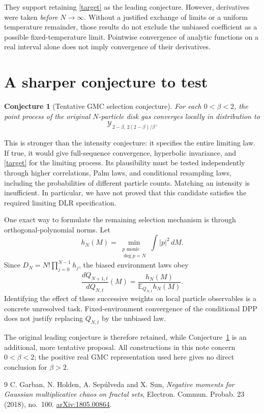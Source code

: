 \documentclass[11pt]{article}
\newcommand{\E}{\mathbb E}
\newtheorem{conjecture}{Conjecture}
\begin{document}
They support retaining \eqref{target} as the leading conjecture. However,
derivatives were taken \emph{before} $N\to\infty$. Without a justified
exchange of limits or a uniform temperature remainder, those results do
not exclude the unbiased coefficient as a possible fixed-temperature
limit. Pointwise convergence of analytic functions on a real interval
alone does not imply convergence of their derivatives.

\section{A sharper conjecture to test}
\begin{conjecture}[Tentative GMC selection conjecture]\label{selection}
For each $0<\beta<2$, the point process of the original $N$-particle disk
gas converges locally in distribution to
\[
 \mathcal Y_{\,2-\beta,\,2(2-\beta)/\beta}.
\]
\end{conjecture}
This is stronger than the intensity conjecture: it specifies the entire
limiting law. If true, it would give full-sequence convergence, hyperbolic
invariance, and \eqref{target} for the limiting process. Its plausibility
must be tested independently through higher correlations, Palm laws, and
conditional resampling laws, including the probabilities of different
particle counts. Matching an intensity is insufficient. In particular,
we have not proved that this candidate satisfies the required limiting
DLR specification.

One exact way to formulate the remaining selection mechanism is through
orthogonal-polynomial norms. Let
\[
 h_N(M)=\min_{\substack{p\text{ monic}\\\deg p=N}}\int|p|^2\,dM.
\]
Since $D_N=N!\prod_{j=0}^{N-1}h_j$, the biased environment laws obey
\begin{equation}\label{increment}
 \frac{dQ_{N+1,t}}{dQ_{N,t}}(M)
 =\frac{h_N(M)}{\E_{Q_{N,t}}h_N(M)}.
\end{equation}
Identifying the effect of these successive weights on local particle
observables is a concrete unresolved task. Fixed-environment convergence
of the conditional DPP does not justify replacing $Q_{N,t}$ by the
unbiased law.

The original leading conjecture is therefore retained, while
Conjecture~\ref{selection} is an additional, more tentative proposal.
All constructions in this note concern $0<\beta<2$; the positive real
GMC representation used here gives no direct conclusion for $\beta>2$.

\begin{thebibliography}{9}
C. Garban, N. Holden, A. Sep\'ulveda and X. Sun,
\emph{Negative moments for Gaussian multiplicative chaos on fractal sets},
Electron. Commun. Probab. 23 (2018), no.~100.
\href{https://arxiv.org/abs/1805.00864}{arXiv:1805.00864}.
\end{thebibliography}
\end{document}
